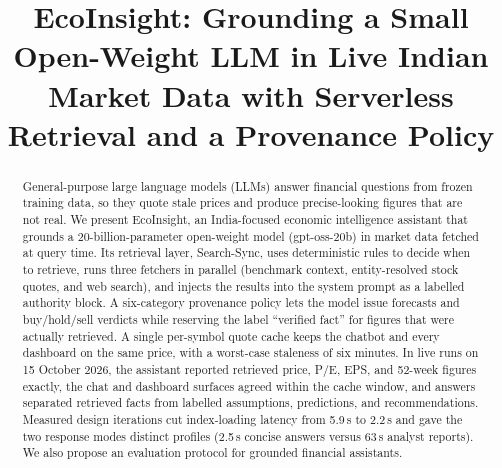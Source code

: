 \documentclass[conference]{IEEEtran}
\begin{document}
\title{EcoInsight: Grounding a Small Open-Weight LLM in Live Indian Market Data with Serverless Retrieval and a Provenance Policy}

\author{
\and
{}
\and
{}
}

\maketitle

\begin{abstract}
General-purpose large language models (LLMs) answer financial questions from frozen training data, so they quote stale prices and produce precise-looking figures that are not real. We present EcoInsight, an India-focused economic intelligence assistant that grounds a 20-billion-parameter open-weight model (gpt-oss-20b) in market data fetched at query time. Its retrieval layer, Search-Sync, uses deterministic rules to decide when to retrieve, runs three fetchers in parallel (benchmark context, entity-resolved stock quotes, and web search), and injects the results into the system prompt as a labelled authority block. A six-category provenance policy lets the model issue forecasts and buy/hold/sell verdicts while reserving the label ``verified fact'' for figures that were actually retrieved. A single per-symbol quote cache keeps the chatbot and every dashboard on the same price, with a worst-case staleness of six minutes. In live runs on 15 October 2026, the assistant reported retrieved price, P/E, EPS, and 52-week figures exactly, the chat and dashboard surfaces agreed within the cache window, and answers separated retrieved facts from labelled assumptions, predictions, and recommendations. Measured design iterations cut index-loading latency from 5.9\,s to 2.2\,s and gave the two response modes distinct profiles (2.5\,s concise answers versus 63\,s analyst reports). We also propose an evaluation protocol for grounded financial assistants.
\end{abstract}
\end{document}
